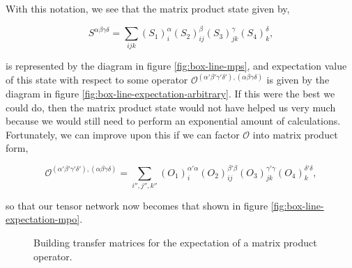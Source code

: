 \documentclass{amsbook}
\theoremstyle{plain}
\theoremstyle{definition}
\theoremstyle{remark}
\newcommand{\paren}[1]{\left(#1\right)}
\begin{document}
With this notation, we see that the matrix product state given by,

$$S^{\alpha\beta\gamma\delta} = \sum_{ijk} \paren{S_1}_{i}^\alpha\paren{S_2}_{ij}^\beta\paren{S_3}_{jk}^\gamma\paren{S_4}_{k}^\delta,$$

\noindent is represented by the diagram in figure \ref{fig:box-line-mps},  and expectation value of this state with respect to some operator $\mathscr{O}^{(\alpha'\beta'\gamma'\delta'),(\alpha\beta\gamma\delta)}$ is given by the diagram in figure \ref{fig:box-line-expectation-arbitrary}.  If this were the best we could do, then the matrix product state would not have helped us very much because we would still need to perform an exponential amount of calculations.  Fortunately, we can improve upon this if we can factor $\mathscr{O}$ into matrix product form,

$$\mathscr{O}^{(\alpha'\beta'\gamma'\delta'),(\alpha\beta\gamma\delta)}
  = \sum_{i'',j'',k''}\paren{O_1}^{\alpha'\alpha}_i\paren{O_2}^{\beta'\beta}_{ij}\paren{O_3}^{\gamma'\gamma}_{jk}\paren{O_4}^{\delta'\delta}_k,
$$

\noindent so that our tensor network now becomes that shown in figure \ref{fig:box-line-expectation-mpo}.

\begin{figure}
\caption{Building transfer matrices for the expectation of a matrix product operator.}
\label{fig:formation-of-transfer-matrices}
\end{figure}
\end{document}
